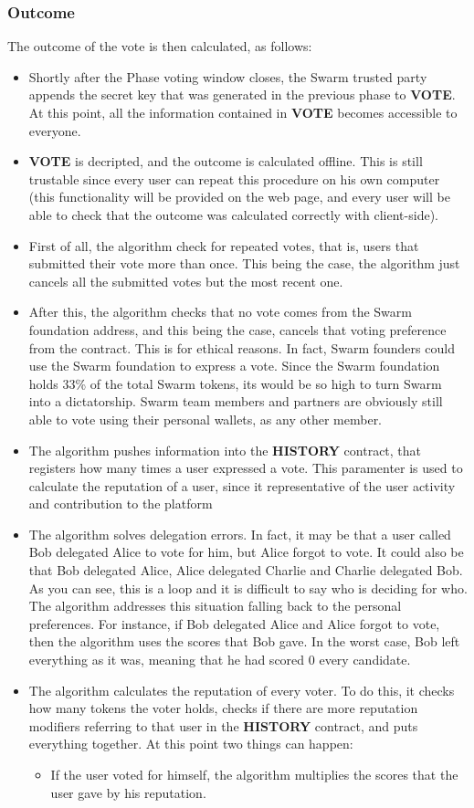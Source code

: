 \documentclass[submission, copyright,creativecommons,sharealike,noncommercial]{eptcs}
\newcommand{\Vote}{\textbf{VOTE}\xspace}
\newcommand{\History}{\textbf{HISTORY}\xspace}
\begin{document}
\subsubsection{Outcome}\label{subsubsec:Intuitive Outcome}
%
		The outcome of the vote is then calculated, as follows:
		\begin{itemize}	
			\item Shortly after the Phase voting window closes, the Swarm trusted party appends the secret key that was generated in the previous phase to \Vote. At this point, all the information contained in \Vote becomes accessible to everyone.
			\item \Vote is decripted, and the outcome is calculated offline. This is still trustable since every user can repeat this procedure on his own computer (this functionality will be provided on the web page, and every user will be able to check that the outcome was calculated correctly with client-side).
			\item First of all, the algorithm check for repeated votes, that is, users that submitted their vote more than once. This being the case, the algorithm just cancels all the submitted votes but the most recent one.
			\item After this, the algorithm checks that no vote comes from the Swarm foundation address, and this being the case, cancels that voting preference from the contract. This is for ethical reasons. In fact, Swarm founders could use the Swarm foundation to express a vote. Since the Swarm foundation holds 33\% of the total Swarm tokens, its would be so high to turn Swarm into a dictatorship. Swarm team members and partners are obviously still able to vote using their personal wallets, as any other member.
			\item The algorithm pushes information into the \History contract, that registers how many times a user expressed a vote. This paramenter is used to calculate the reputation of a user, since it representative of the user activity and contribution to the platform
			\item The algorithm solves delegation errors. In fact, it may be that a user called Bob delegated Alice to vote for him, but Alice forgot to vote. It could also be that Bob delegated Alice, Alice delegated Charlie and Charlie delegated Bob. As you can see, this is a loop and it is difficult to say who is deciding for who. The algorithm addresses this situation falling back to the personal preferences. For instance, if Bob delegated Alice and Alice forgot to vote, then the algorithm uses the scores that Bob gave. In the worst case, Bob left everything as it was, meaning that he had scored $0$ every candidate.
			\item The algorithm calculates the reputation of every voter. To do this, it checks how many tokens the voter holds, checks if there are more reputation modifiers referring to that user in the \History contract, and puts everything together. At this point two things can happen:
			\begin{itemize}
				\item If the user voted for himself, the algorithm multiplies the scores that the user gave by his reputation.
				

\end{itemize}
\end{itemize}
\end{document}
